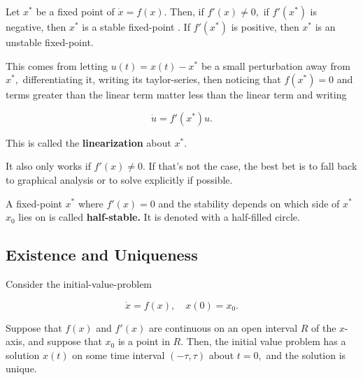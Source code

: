 \documentclass{article}
\begin{document}
\begin{theorem}\label{linear-stability-analysis}
Let $x^*$ be a fixed point of $\dot{x} = f(x).$ Then, if $f'(x) \neq 0,$ if $f'(x^*)$ is negative, then $x^*$ is a \@{stable} \@{fixed-point}
. If $f'(x^*)$ is positive, then $x^*$ is an \@{unstable} \@{fixed-point}.
\end{theorem}

\begin{remark}
This comes from letting $u(t) = x(t) - x^*$ be a small perturbation away from $x^*,$ differentiating it, writing its \@{taylor-series}, then noticing that $f(x^*) = 0$ and terms greater than the linear term matter less than the linear term and writing

\[ \dot{u} = f'(x^*)u. \]

This is called  the \textbf{linearization} about $x^*.$

It also only works if $f'(x) \neq 0.$ If that's not the case, the best bet is to fall back to graphical analysis or to solve explicitly if possible.
\end{remark}

\begin{definition}
A \@{fixed-point} $x^*$ where $f'(x) = 0$ and the stability depends on which side of $x^*$ $x_0$ lies on is called \textbf{half-stable.} It is denoted with a half-filled circle.
\end{definition}

\subsection{Existence and Uniqueness}

\begin{theorem}\label{existence-and-uniqueness-of-ivp-solutions}
Consider the \@{initial-value-problem}

\[ \dot{x} = f(x), \quad x(0) = x_0. \]

Suppose that $f(x)$ and $f'(x)$ are \@{continuous} on an \@{open} \@{interval} $R$ of the $x$-axis, and suppose that $x_0$ is a \@{point} in $R.$ Then, the initial value problem has a solution $x(t)$ on some time interval $(- \tau, \tau)$ about $t = 0,$ and the solution is unique.
\end{theorem}
\end{document}
